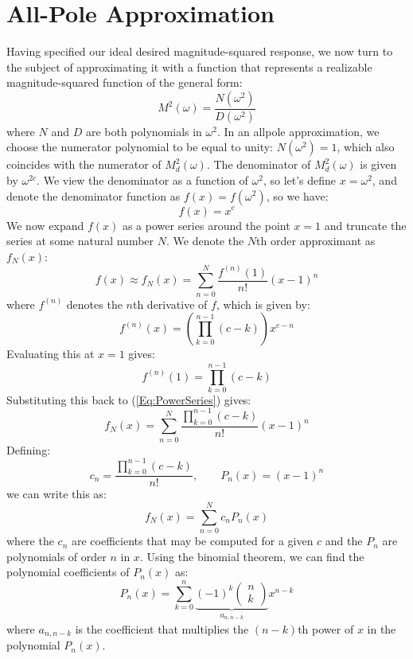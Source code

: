 \section{All-Pole Approximation}
Having specified our ideal desired magnitude-squared response, we now turn to the subject of approximating it with a function that represents a realizable magnitude-squared function of the general form:
\begin{equation}
M^2(\omega) = \frac{N(\omega^2)}{D(\omega^2)}
\end{equation}
where $N$ and $D$ are both polynomials in $\omega^2$. In an allpole approximation, we choose the numerator polynomial to be equal to unity: $N(\omega^2)=1$, which also coincides with the numerator of $M_d^2(\omega)$. The denominator of $M_d^2(\omega)$ is given by $\omega^{2c}$. We view the denominator as a function of $\omega^2$, so let's define $x = \omega^2$, and denote the denominator function as $f(x) = f(\omega^2)$, so we have:
\begin{equation}
f(x) = x^c
\end{equation}
We now expand $f(x)$ as a power series around the point $x = 1$ and truncate the series at some natural number $N$. We denote the $N$th order approximant as $f_N(x)$:
\begin{equation}
\label{Eq:PowerSeries}
f(x) \approx f_N(x) = \sum_{n=0}^N \frac{f^{(n)}(1)}{n!} (x-1)^n
\end{equation}
where $f^{(n)}$ denotes the $n$th derivative of $f$, which is given by:
\begin{equation}
f^{(n)}(x) = \left( \prod_{k=0}^{n-1} (c - k) \right) x^{c-n}
\end{equation}
Evaluating this at $x = 1$ gives:
\begin{equation}
f^{(n)}(1) = \prod_{k=0}^{n-1} (c - k)
\end{equation}
Substituting this back to (\ref{Eq:PowerSeries}) gives:
\begin{equation}
f_N(x) = \sum_{n=0}^N \frac{\prod_{k=0}^{n-1} (c - k)}{n!} (x-1)^n
\end{equation}
Defining:
\begin{equation}
 c_n = \frac{\prod_{k=0}^{n-1} (c - k)}{n!}, \qquad P_n(x) = (x-1)^n
\end{equation}
we can write this as:
\begin{equation}
f_N(x) = \sum_{n=0}^N c_n P_n(x)
\end{equation}
where the $c_n$ are coefficients that may be computed for a given $c$ and the $P_n$ are polynomials of order $n$ in $x$. Using the binomial theorem, we can find the polynomial coefficients of $P_n(x)$ as:
\begin{equation}
P_n(x) = \sum_{k=0}^n \underbrace{(-1)^k  \begin{pmatrix} n \\ k  \end{pmatrix}}_{a_{n, n-k}} x^{n-k}
\end{equation}
where $a_{n, n-k}$ is the coefficient that multiplies the $(n-k)$th power of $x$ in the polynomial $P_n(x)$.


